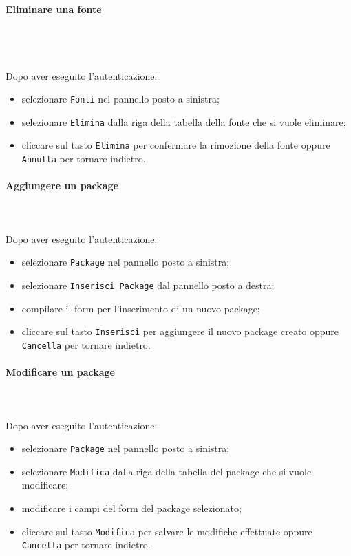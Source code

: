 \paragraph{Eliminare una fonte} \mbox{}\\ \mbox{}\\\\
Dopo aver eseguito l'autenticazione:
\begin{itemize}
	\item selezionare \texttt{Fonti} nel pannello posto a sinistra;
	\item selezionare \texttt{Elimina} dalla riga della tabella della fonte 
		che si vuole eliminare;\
	\item cliccare sul tasto \texttt{Elimina} per confermare la rimozione della fonte
		oppure \texttt{Annulla} per tornare indietro.
\end{itemize}

\paragraph{Aggiungere un package} \mbox{}\\ \mbox{}\\
Dopo aver eseguito l'autenticazione:
\begin{itemize}
	\item selezionare \texttt{Package} nel pannello posto a sinistra;
	\item selezionare \texttt{Inserisci Package} dal pannello posto a destra;
	\item compilare il form per l'inserimento di un nuovo package;
	\item cliccare sul tasto \texttt{Inserisci} per aggiungere il nuovo package
		creato oppure \texttt{Cancella} per tornare indietro.	
\end{itemize}

\paragraph{Modificare un package} \mbox{}\\ \mbox{}\\
Dopo aver eseguito l'autenticazione:
\begin{itemize}
	\item selezionare \texttt{Package} nel pannello posto a sinistra;
	\item selezionare \texttt{Modifica} dalla riga della tabella del package
		che si vuole modificare;
	\item modificare i campi del form del package selezionato;
	\item cliccare sul tasto \texttt{Modifica} per salvare le modifiche effettuate
		oppure \texttt{Cancella} per tornare indietro.
\end{itemize}

